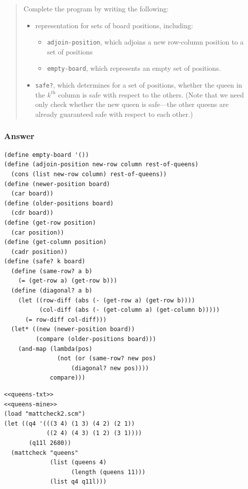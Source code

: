 \documentclass[final,fleqn,titlepage,twoside]{article}
\begin{document}
\begin{quote}
Complete the program by writing the following:
\begin{itemize}
\item representation for sets of board positions, including:
\begin{itemize}
\item \texttt{adjoin-position}, which adjoins a new row-column position to a
set of positions
\item \texttt{empty-board}, which represents an empty set of positions.
\end{itemize}
\item \texttt{safe?}, which determines for a set of positions, whether the queen
in the \(k^{\mathrm{th}}\) column is safe with respect to the others. (Note
that we need only check whether the new queen is safe---the other queens are
already guaranteed safe with respect to each other.)
\end{itemize}
\end{quote}

\subsubsection{Answer}
\label{sec:orgc959aa3}
\begin{verbatim}
(define empty-board '())
(define (adjoin-position new-row column rest-of-queens)
  (cons (list new-row column) rest-of-queens))
(define (newer-position board)
  (car board))
(define (older-positions board)
  (cdr board))
(define (get-row position)
  (car position))
(define (get-column position)
  (cadr position))
(define (safe? k board)
  (define (same-row? a b)
    (= (get-row a) (get-row b)))
  (define (diagonal? a b)
    (let ((row-diff (abs (- (get-row a) (get-row b))))
          (col-diff (abs (- (get-column a) (get-column b)))))
      (= row-diff col-diff)))
  (let* ((new (newer-position board))
         (compare (older-positions board)))
    (and-map (lambda(pos)
               (not (or (same-row? new pos)
                   (diagonal? new pos))))
             compare)))
\end{verbatim}
\begin{verbatim}
<<queens-txt>>
<<queens-mine>>
(load "mattcheck2.scm")
(let ((q4 '(((3 4) (1 3) (4 2) (2 1))
            ((2 4) (4 3) (1 2) (3 1))))
       (q11l 2680))
  (mattcheck "queens"
             (list (queens 4)
                   (length (queens 11)))
             (list q4 q11l)))
\end{verbatim}
\end{document}
